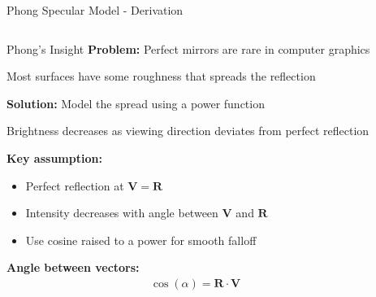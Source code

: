\begin{frame}{Phong Specular Model - Derivation}
  \begin{columns}
    \begin{column}{0.6\textwidth}
      \begin{mathbox}{Phong's Insight}
        \textbf{Problem:} Perfect mirrors are rare in computer graphics

        Most surfaces have some roughness that spreads the reflection

        \vspace{0.3cm}
        \pause
        \textbf{Solution:} Model the spread using a power function

        Brightness decreases as viewing direction deviates from perfect reflection

        \vspace{0.3cm}
        \pause
        \textbf{Key assumption:}
        \begin{itemize}
          \item Perfect reflection at $\mathbf{V} = \mathbf{R}$
          \item Intensity decreases with angle between $\mathbf{V}$ and $\mathbf{R}$
          \item Use cosine raised to a power for smooth falloff
        \end{itemize}

        \vspace{0.3cm}
        \textbf{Angle between vectors:}
        \begin{align}
          \cos(\alpha) = \mathbf{R} \cdot \mathbf{V}
        \end{align}
      \end{mathbox}
    \end{column}
    \begin{column}{0.4\textwidth}
\end{column}
\end{columns}
\end{frame}
